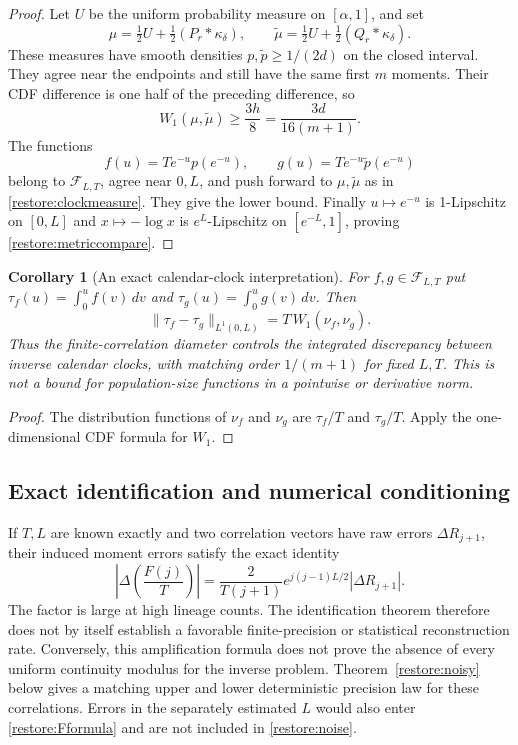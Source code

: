 \documentclass[11pt]{article}
\newtheorem{corollary}[theorem]{Corollary}
\theoremstyle{definition}
\theoremstyle{remark}
\numberwithin{equation}{section}
\begin{document}
\begin{proof}
Let $U$ be the uniform probability measure on $[\alpha,1]$, and set
\[
 \mu=\tfrac12U+\tfrac12(P_r*\kappa_\delta),\qquad
 \widetilde\mu=\tfrac12U+\tfrac12(Q_r*\kappa_\delta).
\]
These measures have smooth densities $p,\widetilde p\ge1/(2d)$ on
the closed interval.  They agree near the endpoints and still have the
same first $m$ moments.  Their CDF difference is one half of the
preceding difference, so
\[
 W_1(\mu,\widetilde\mu)\ge\frac{3h}{8}
                                  =\frac{3d}{16(m+1)}.
\]
The functions
\[
 f(u)=Te^{-u}p(e^{-u}),\qquad
 g(u)=Te^{-u}\widetilde p(e^{-u})
\]
belong to $\mathcal F_{L,T}$, agree near $0,L$, and push forward to
$\mu,\widetilde\mu$ as in \eqref{restore:clockmeasure}.  They give the
lower bound.  Finally $u\mapsto e^{-u}$ is 1-Lipschitz on $[0,L]$ and
$x\mapsto-\log x$ is $e^L$-Lipschitz on $[e^{-L},1]$, proving
\eqref{restore:metriccompare}.
\end{proof}

\begin{corollary}[An exact calendar-clock interpretation]
\label{restore:clockLone}
For $f,g\in\mathcal F_{L,T}$ put
$\tau_f(u)=\int_0^u f(v)\,dv$ and
$\tau_g(u)=\int_0^u g(v)\,dv$.  Then
\[
     \|\tau_f-\tau_g\|_{L^1(0,L)}=T\,W_1(\nu_f,\nu_g).
\]
Thus the finite-correlation diameter controls the integrated discrepancy
between inverse calendar clocks, with matching order $1/(m+1)$ for fixed
$L,T$.  This is not a bound for population-size functions in a
pointwise or derivative norm.
\end{corollary}
\begin{proof}
The distribution functions of $\nu_f$ and $\nu_g$ are $\tau_f/T$ and
$\tau_g/T$.  Apply the one-dimensional CDF formula for $W_1$.
\end{proof}

\subsection{Exact identification and numerical conditioning}

If $T,L$ are known exactly and two correlation vectors have raw errors
$\Delta R_{j+1}$, their induced moment errors satisfy the exact identity
\begin{equation}\label{restore:noise}
 \left|\Delta\left(\frac{F(j)}T\right)\right|
       =\frac{2}{T(j+1)}e^{j(j-1)L/2}|\Delta R_{j+1}|.
\end{equation}
The factor is large at high lineage counts.  The identification theorem
therefore does not by itself establish a favorable finite-precision or
statistical reconstruction rate.  Conversely, this amplification formula
does not prove the absence of every uniform continuity modulus for the
inverse problem.  Theorem~\ref{restore:noisy} below gives a matching
upper and lower deterministic precision law for these correlations.
Errors in the separately estimated $L$ would also enter
\eqref{restore:Fformula} and are not included in
\eqref{restore:noise}.
\end{document}
